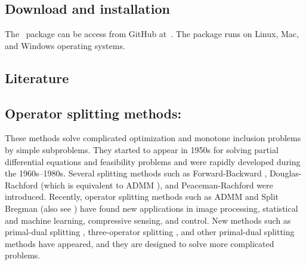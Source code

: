 
\subsection{Download and installation}
The \pkg~package can be access from GitHub at~\repo. The package runs on Linux, Mac, and Windows operating systems.
\subsection{Literature}\label{sec:review}
\subsection*{Operator splitting methods:}  These methods solve complicated optimization and monotone inclusion problems by simple subproblems. They started to appear in 1950s for  solving partial differential equations and feasibility problems and were rapidly developed during the 1960s--1980s. Several splitting methods such as Forward-Backward \citep{Passty1979_ergodic}, Douglas-Rachford \citep{DR56} (which is equivalent to ADMM \citep{GabayMercier1976_dual,GlowinskiMarroco1975_approximation}), and Peaceman-Rachford \citep{PR} were introduced. Recently,
operator splitting methods such as ADMM and Split Bregman \citep{GoldsteinOsher2009_split} (also see \citep{WangYangYinZhang2008_NewAlternating}) have found new applications in image processing,
statistical and machine learning, compressive sensing, and control. New methods such as primal-dual splitting \citep{Condat2013_primaldual,Vu2013_splitting}, three-operator splitting \citep{DavisYin2015_threeoperator}, and other primal-dual splitting methods \citep{ChenHuangZhang2016_primaldual,ChenHuangZhang2016_primalduala,LiShenXuZhang2015_multistep} have appeared, and they are designed to solve more complicated problems.


